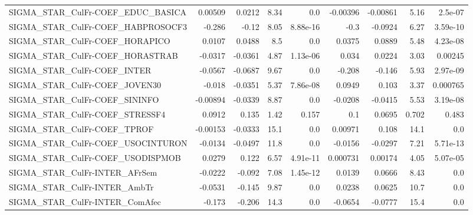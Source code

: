 \begin{tabular}{lrrrrrrrr}
SIGMA\_STAR\_CulFr-COEF\_EDUC\_BASICA      &     0.00509 &       0.0212 &     8.34 &      0.0 &   -0.00396 &    -0.00861 &         5.16 &       2.5e-07 \\
SIGMA\_STAR\_CulFr-COEF\_HABPROSOCF3      &      -0.286 &        -0.12 &     8.05 & 8.88e-16 &       -0.3 &     -0.0924 &         6.27 &      3.59e-10 \\
SIGMA\_STAR\_CulFr-COEF\_HORAPICO         &      0.0107 &       0.0488 &      8.5 &      0.0 &     0.0375 &      0.0889 &         5.48 &      4.23e-08 \\
SIGMA\_STAR\_CulFr-COEF\_HORASTRAB        &     -0.0317 &      -0.0361 &     4.87 & 1.13e-06 &      0.034 &      0.0224 &         3.03 &       0.00245 \\
SIGMA\_STAR\_CulFr-COEF\_INTER            &     -0.0567 &      -0.0687 &     9.67 &      0.0 &     -0.208 &      -0.146 &         5.93 &      2.97e-09 \\
SIGMA\_STAR\_CulFr-COEF\_JOVEN30          &      -0.018 &      -0.0351 &     5.37 & 7.86e-08 &     0.0949 &       0.103 &         3.37 &      0.000765 \\
SIGMA\_STAR\_CulFr-COEF\_SININFO          &    -0.00894 &      -0.0339 &     8.87 &      0.0 &    -0.0208 &     -0.0415 &         5.53 &      3.19e-08 \\
SIGMA\_STAR\_CulFr-COEF\_STRESSF4         &      0.0912 &        0.135 &     1.42 &    0.157 &        0.1 &      0.0695 &        0.702 &         0.483 \\
SIGMA\_STAR\_CulFr-COEF\_TPROF            &    -0.00153 &      -0.0333 &     15.1 &      0.0 &    0.00971 &       0.108 &         14.1 &           0.0 \\
SIGMA\_STAR\_CulFr-COEF\_USOCINTURON      &     -0.0134 &      -0.0497 &     11.8 &      0.0 &    -0.0156 &     -0.0297 &         7.21 &      5.71e-13 \\
SIGMA\_STAR\_CulFr-COEF\_USODISPMOB       &      0.0279 &        0.122 &     6.57 & 4.91e-11 &   0.000731 &     0.00174 &         4.05 &      5.07e-05 \\
SIGMA\_STAR\_CulFr-INTER\_AFrSem          &     -0.0222 &       -0.092 &     7.08 & 1.45e-12 &     0.0139 &      0.0666 &         8.43 &           0.0 \\
SIGMA\_STAR\_CulFr-INTER\_AmbTr           &     -0.0531 &       -0.145 &     9.87 &      0.0 &     0.0238 &      0.0625 &         10.7 &           0.0 \\
SIGMA\_STAR\_CulFr-INTER\_ComAfec         &      -0.173 &       -0.206 &     14.3 &      0.0 &    -0.0654 &     -0.0777 &         15.4 &           0.0 \\

\end{tabular}
